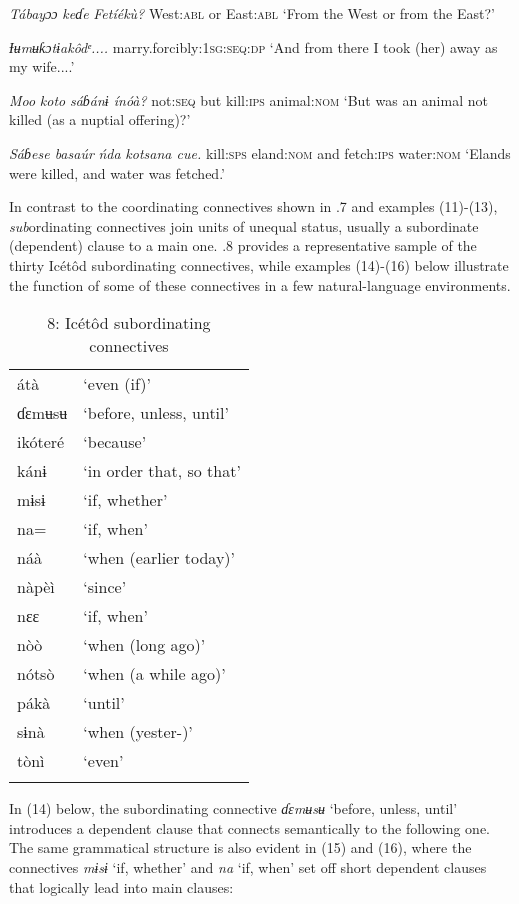 \textit{Tábayɔɔ}   \textit{keɗe}\textit{   Fetíékù?}
West:\textsc{abl}   or   East:\textsc{abl}
‘From the West or from the East?’



\textit{Ɨʉmʉƙɔtɨakôdᵉ....} 
marry.forcibly:\textsc{1sg:seq:dp}
‘And from there I took (her) away as my wife....’

\textit{Moo}     \textit{koto}\textit{   sáɓánɨ   ínóà?}
not:\textsc{seq}   but   kill:\textsc{ips}   animal:\textsc{nom}
‘But was an animal not killed (as a nuptial offering)?’



\textit{Sáɓese   basaúr}   \textit{ńda}\textit{   kotsana   cue.}
kill:\textsc{sps}  eland:\textsc{nom}   and   fetch:\textsc{ips} water:\textsc{nom}
‘Elands were killed, and water was fetched.’

In contrast to the coordinating connectives shown in .7 and examples (11)-(13), \textit{sub}ordinating connectives join units of unequal status, usually a subordinate (dependent) clause to a main one. .8 provides a representative sample of the thirty Icétôd subordinating connectives, while examples (14)-(16) below illustrate the function of some of these connectives in a few natural-language environments.


\begin{table}
\caption{8: Icétôd subordinating connectives}
\label{tab:3}


\begin{tabularx}{\textwidth}{XX}
\lsptoprule

átà & ‘even (if)’\\
ɗɛmʉsʉ & ‘before, unless, until’\\
ikóteré & ‘because’\\
kánɨ & ‘in order that, so that’\\
mɨsɨ & ‘if, whether’\\
na= & ‘if, when’\\
náà & ‘when (earlier today)’\\
nàpèì & ‘since’\\
nɛɛ & ‘if, when’\\
nòò & ‘when (long ago)’\\
nótsò & ‘when (a while ago)’\\
pákà & ‘until’\\
sɨnà & ‘when (yester-)’\\
tònì & ‘even’\\
\lspbottomrule
\end{tabularx}
\end{table}
In (14) below, the subordinating connective \textit{ɗɛmʉsʉ} ‘before, unless, until’ introduces a dependent clause that connects semantically to the following one. The same grammatical structure is also evident in (15) and (16), where the connectives \textit{mɨsɨ} ‘if, whether’ and \textit{na} ‘if, when’ set off short dependent clauses that logically lead into main clauses:



